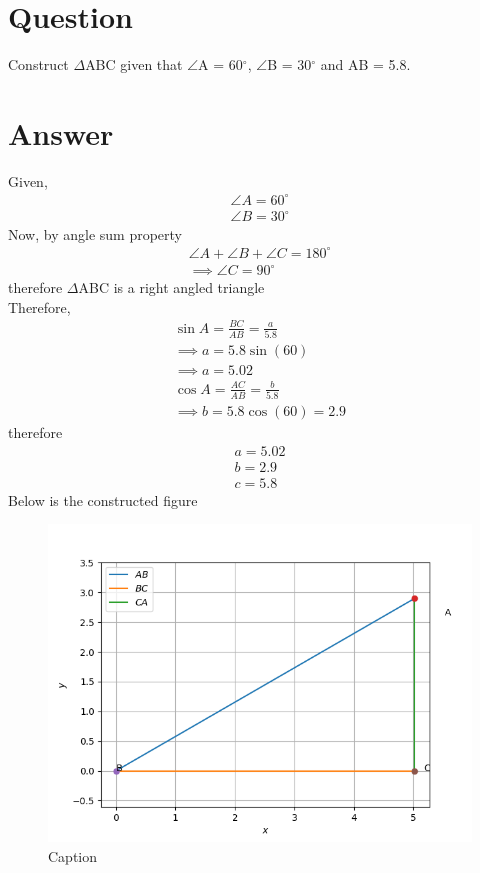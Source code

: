 \documentclass{article}
\begin{document}
\section{Question}
Construct $\Delta$ABC given that $\angle$A = 60$^\circ$, $\angle$B = 30$^\circ$ and AB = 5.8.
\section{Answer}
Given,
\begin{gather*}
    \angle A = 60^\circ \\
    \angle B = 30^\circ 
\end{gather*}
Now, by angle sum property
\begin{gather*}
    \angle A + \angle B + \angle C = 180^\circ \\
    \implies \angle C = 90^\circ
\end{gather*}
therefore $\Delta$ABC is a right angled triangle\\
Therefore, \\
\begin{gather*}
    \sin{A} = \frac{BC}{AB} = \frac{a}{5.8}\\
    \implies a = 5.8\sin{(60)}\\
    \implies a = 5.02\\
    \cos{A} = \frac{AC}{AB} = \frac{b}{5.8}\\
    \implies b = 5.8\cos{(60)} = 2.9
\end{gather*}
therefore 
\begin{gather*}
    a = 5.02\\
    b = 2.9 \\
    c = 5.8
\end{gather*}
\newpage
Below is the constructed figure
\begin{figure}[h!]
    \centering
    \includegraphics{Figure_2.png}
    \caption{Caption}
    \label{fig:my_label}
\end{figure}
\end{document}
